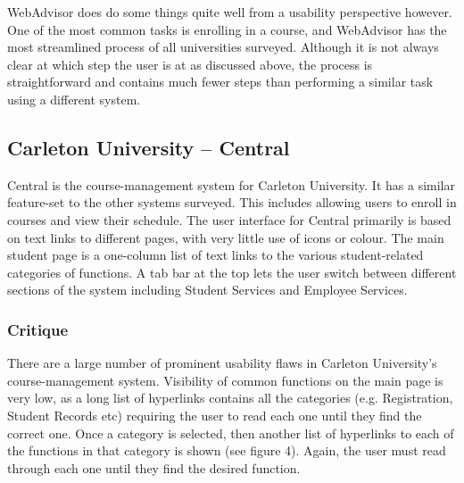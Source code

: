 \documentclass[10pt]{article}
\newenvironment{InlineColumnFigure}
{\par\medskip\noindent\minipage{\linewidth}}
{\endminipage\par\medskip}
\newcommand{\Caption}[1]
{\vspace{-4mm}\fontsize{9}{9}\textbf{Figure \refstepcounter{figCounter} 
\arabic{figCounter}: #1}}
\newcounter{figCounter}
\begin{document}
\begin{multicols}{2}
WebAdvisor does do some things quite well from a usability perspective however. 
One of the most common tasks is enrolling in a course, and WebAdvisor has the 
most streamlined process of all universities surveyed. Although it is not always 
clear at which step the user is at as discussed above, the process is 
straightforward and contains much fewer steps than performing a similar task 
using a different system.

\subsection*{Carleton University -- Central}
Central is the course-management system for Carleton University. It has a 
similar feature-set to the other systems surveyed. This includes allowing users 
to enroll in courses and view their schedule. The user interface for Central 
primarily is based on text links to different pages, with very little use of 
icons or colour. The main student page is a one-column list of text links to the 
various student-related categories of functions. A tab bar at the top lets the 
user switch between different sections of the system including Student Services 
and Employee Services.


\subsubsection*{Critique}
There are a large number of prominent usability flaws in Carleton University's 
course-management system. Visibility of common functions on the main 
page is very low, as a long list of hyperlinks contains all the categories (e.g. 
Registration, Student Records etc) requiring the user to read each one until 
they find the correct one. Once a category is selected, then another list of 
hyperlinks to each of the functions in that category is shown (see figure 4). 
Again, the user must read through each one until they find the desired function.




\end{multicols}
\end{document}

